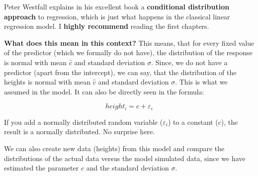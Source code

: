 \documentclass[
]{book}
\begin{document}
Peter Westfall explains in his excellent book a \textbf{conditional distribution
approach} to regression, which is just what happens in the classical linear regression model.
I \textbf{highly recommend} reading the first chapters.

\textbf{What does this mean in this context?}
This means, that for every fixed value of the predictor (which we formally do not have),
the distribution of the response is normal with mean \(\hat{c}\) and standard deviation \(\sigma\).
Since, we do not have a predictor (apart from the intercept), we can say, that the distribution of the heights is normal with mean \(\hat{c}\)
and standard deviation \(\sigma\). This is what we assumed in the model. It can also be directly seen
in the formula:

\[ height_i = c + \varepsilon_i \]

If you add a normally distributed random variable (\(\varepsilon_i\)) to a constant (\(c\)),
the result is a normally distributed. No surprise here.

We can also create new data (heights) from this model and compare the distributions
of the actual data versus the model simulated data, since we have estimated the
parameter \(c\) and the standard deviation \(\sigma\).
\end{document}
